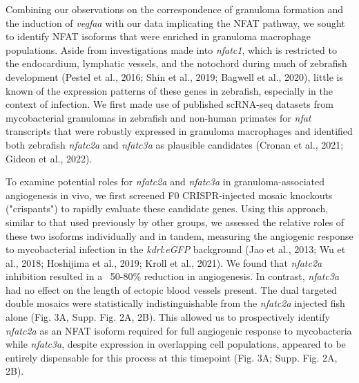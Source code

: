 Combining our observations on the correspondence of granuloma formation and the induction of \textit{vegfaa} with our data implicating the NFAT pathway, we sought to identify NFAT isoforms that were enriched in granuloma macrophage populations. Aside from investigations made into \textit{nfatc1}, which is restricted to the endocardium, lymphatic vessels, and the notochord during much of zebrafish development (Pestel et al., 2016; Shin et al., 2019; Bagwell et al., 2020), little is known of the expression patterns of these genes in zebrafish, especially in the context of infection. We first made use of published scRNA-seq datasets from mycobacterial granulomas in zebrafish and non-human primates for \textit{nfat} transcripts that were robustly expressed in granuloma macrophages and identified both zebrafish \textit{nfatc2a} and \textit{nfatc3a} as plausible candidates (Cronan et al., 2021; Gideon et al., 2022).

To examine potential roles for \textit{nfatc2a} and \textit{nfatc3a} in granuloma-associated angiogenesis in vivo, we first screened F0 CRISPR-injected mosaic knockouts ("crispants") to rapidly evaluate these candidate genes. Using this approach, similar to that used previously by other groups, we assessed the relative roles of these two isoforms individually and in tandem, measuring the angiogenic response to mycobacterial infection in the \textit{kdrl}:\textit{eGFP} background (Jao et al., 2013; Wu et al., 2018; Hoshijima et al., 2019; Kroll et al., 2021). We found that \textit{nfatc2a} inhibition resulted in a ~50-80\% reduction in angiogenesis. In contrast, \textit{nfatc3a} had no effect on the length of ectopic blood vessels present. The dual targeted double mosaics were statistically indistinguishable from the \textit{nfatc2a} injected fish alone (Fig. 3A, Supp. Fig. 2A, 2B). This allowed us to prospectively identify \textit{nfatc2a} as an NFAT isoform required for full angiogenic response to mycobacteria while \textit{nfatc3a}, despite expression in overlapping cell populations, appeared to be entirely dispensable for this process at this timepoint (Fig. 3A; Supp. Fig. 2A, 2B). 

